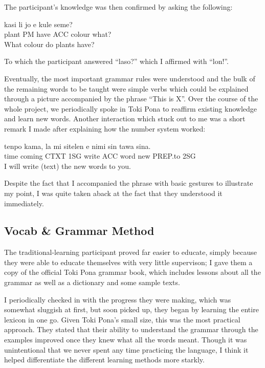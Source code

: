 \documentclass[a4paper,10pt]{article}
\begin{document}
The participant's knowledge was then confirmed by asking the following:

\begin{exe}
 \ex
 \gll kasi li jo e kule seme? \\
 plant PM have ACC colour what?\\
 \glt What colour do plants have?
\end{exe}

To which the participant answered ``laso?'' which I affirmed with ``lon!''.

Eventually, the most important grammar rules were understood and the bulk of the remaining words to
be taught were simple verbs which could be explained through a picture accompanied by the phrase
``This is X''. Over the course of the whole project, we periodically spoke in Toki Pona to reaffirm
existing knowledge and learn new words. Another interaction which stuck out to me was a short
remark I made after explaining how the number system worked:

\begin{exe}
 \ex
 \gll tenpo kama, la mi sitelen e nimi sin tawa sina. \\
 time coming CTXT 1SG write ACC word new PREP.to 2SG \\
 \glt I will write (text) the new words to you.
\end{exe}

Despite the fact that I accompanied the phrase with basic gestures to illustrate my point,
I was quite taken aback at the fact that they understood it immediately.


\subsection{Vocab \& Grammar Method}
The traditional-learning participant proved far easier to educate, simply because they were able to
educate themselves with very little supervison; I gave them a copy of the official Toki Pona grammar
book, which includes lessons about all the grammar as well as a dictionary and some sample texts.

I periodically checked in with the progress they were making, which was somewhat sluggish at first, but
soon picked up, they began by learning the entire lexicon in one go. Given Toki Pona's small size, this
was the most practical approach. They stated that their ability to understand the grammar through the examples
improved once they knew what all the words meant. Though it was unintentional that we never spent any time
practicing the language, I think it helped differentiate the different learning methods more starkly.
\end{document}
